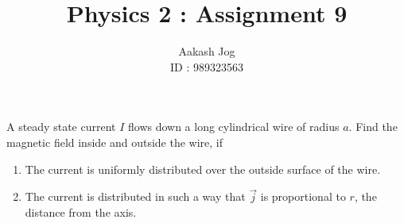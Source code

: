\documentclass[fleqn, a4paper, 11pt, oneside]{amsart}
\title{Physics 2 : Assignment 9}
\author
{
	Aakash Jog\\
	ID : 989323563
}
\date{\formatdate{27}{5}{2015}}
\theoremstyle{definition}
\theoremstyle{theorem}
\begin{document}
\maketitle

\begin{question}
	A steady state current $I$ flows down a long cylindrical wire of radius $a$.
	Find the magnetic field inside and outside the wire, if
	\begin{enumerate}
		\item The current is uniformly distributed over the outside surface of the wire.
		\item The current is distributed in such a way that $\overrightarrow{j}$ is proportional to $r$, the distance from the axis.
	\end{enumerate}
\end{question}
\end{document}
